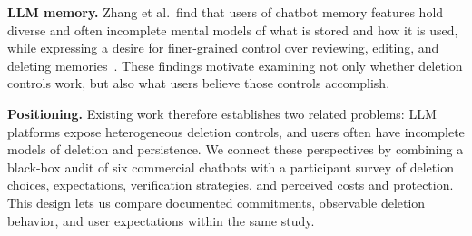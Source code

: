 \documentclass[conference,compsoc]{IEEEtran}
\begin{document}
\textbf{LLM memory.} Zhang et al.\ find that users of chatbot memory
features hold diverse and often incomplete mental models of what is stored
and how it is used, while expressing a desire for finer-grained control over
reviewing, editing, and deleting memories~\cite{zhang2025understanding}.
These findings motivate examining not only whether deletion controls work,
but also what users believe those controls accomplish.

\textbf{Positioning.} Existing work therefore establishes two related
problems: LLM platforms expose heterogeneous deletion controls, and users
often have incomplete models of deletion and persistence. We connect these
perspectives by combining a black-box audit of six commercial chatbots with
a participant survey of deletion choices, expectations, verification
strategies, and perceived costs and protection. This design lets us compare
documented commitments, observable deletion behavior, and user expectations
within the same study.
\end{document}
